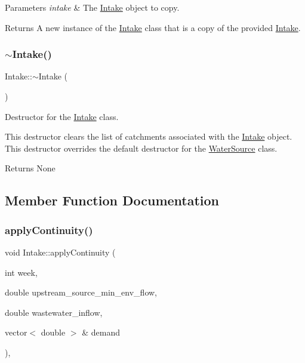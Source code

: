 \begin{DoxyParams}{Parameters}
{\em intake} & The \mbox{\hyperlink{classIntake}{Intake}} object to copy.\\
\hline
\end{DoxyParams}
\begin{DoxyReturn}{Returns}
A new instance of the \mbox{\hyperlink{classIntake}{Intake}} class that is a copy of the provided \mbox{\hyperlink{classIntake}{Intake}}. 
\end{DoxyReturn}
\mbox{\label{classIntake_abf57ff6edf55f292921fb7838059ad26}} 
\subsubsection{\texorpdfstring{$\sim$\+Intake()}{~Intake()}}
{\footnotesize\ttfamily Intake\+::$\sim$\+Intake (\begin{DoxyParamCaption}{ }\end{DoxyParamCaption})\hspace{0.3cm}{\ttfamily [override]}}



Destructor for the \mbox{\hyperlink{classIntake}{Intake}} class. 

This destructor clears the list of catchments associated with the \mbox{\hyperlink{classIntake}{Intake}} object. This destructor overrides the default destructor for the \mbox{\hyperlink{classWaterSource}{Water\+Source}} class.

\begin{DoxyReturn}{Returns}
None 
\end{DoxyReturn}


\subsection{Member Function Documentation}
\mbox{\label{classIntake_acd5ab74c4091b286e69ecdcc495d83ce}} 
\subsubsection{\texorpdfstring{apply\+Continuity()}{applyContinuity()}}
{\footnotesize\ttfamily void Intake\+::apply\+Continuity (\begin{DoxyParamCaption}\item[{int}]{week,  }\item[{double}]{upstream\+\_\+source\+\_\+min\+\_\+env\+\_\+flow,  }\item[{double}]{wastewater\+\_\+inflow,  }\item[{vector$<$ double $>$ \&}]{demand }\end{DoxyParamCaption})\hspace{0.3cm}{\ttfamily [override]}, {\ttfamily [virtual]}}



